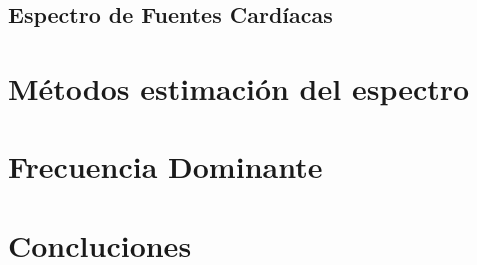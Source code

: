\subsection{Espectro de Fuentes Cardíacas}

%
%
%
%
%
%


\section{Métodos estimación del espectro}
\section{Frecuencia Dominante}


\section{Concluciones}
